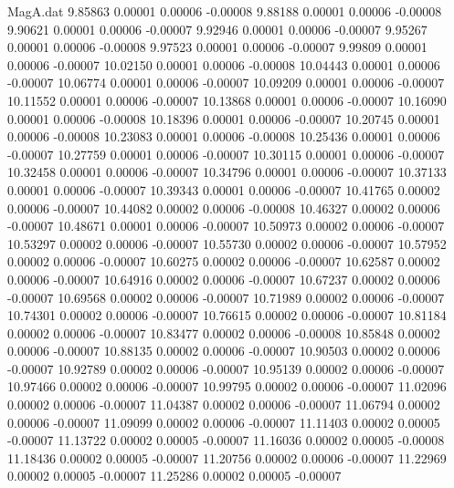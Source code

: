 \begin{filecontents}{MagA.dat}
   9.85863    0.00001    0.00006   -0.00008
   9.88188    0.00001    0.00006   -0.00008
   9.90621    0.00001    0.00006   -0.00007
   9.92946    0.00001    0.00006   -0.00007
   9.95267    0.00001    0.00006   -0.00008
   9.97523    0.00001    0.00006   -0.00007
   9.99809    0.00001    0.00006   -0.00007
  10.02150    0.00001    0.00006   -0.00008
  10.04443    0.00001    0.00006   -0.00007
  10.06774    0.00001    0.00006   -0.00007
  10.09209    0.00001    0.00006   -0.00007
  10.11552    0.00001    0.00006   -0.00007
  10.13868    0.00001    0.00006   -0.00007
  10.16090    0.00001    0.00006   -0.00008
  10.18396    0.00001    0.00006   -0.00007
  10.20745    0.00001    0.00006   -0.00008
  10.23083    0.00001    0.00006   -0.00008
  10.25436    0.00001    0.00006   -0.00007
  10.27759    0.00001    0.00006   -0.00007
  10.30115    0.00001    0.00006   -0.00007
  10.32458    0.00001    0.00006   -0.00007
  10.34796    0.00001    0.00006   -0.00007
  10.37133    0.00001    0.00006   -0.00007
  10.39343    0.00001    0.00006   -0.00007
  10.41765    0.00002    0.00006   -0.00007
  10.44082    0.00002    0.00006   -0.00008
  10.46327    0.00002    0.00006   -0.00007
  10.48671    0.00001    0.00006   -0.00007
  10.50973    0.00002    0.00006   -0.00007
  10.53297    0.00002    0.00006   -0.00007
  10.55730    0.00002    0.00006   -0.00007
  10.57952    0.00002    0.00006   -0.00007
  10.60275    0.00002    0.00006   -0.00007
  10.62587    0.00002    0.00006   -0.00007
  10.64916    0.00002    0.00006   -0.00007
  10.67237    0.00002    0.00006   -0.00007
  10.69568    0.00002    0.00006   -0.00007
  10.71989    0.00002    0.00006   -0.00007
  10.74301    0.00002    0.00006   -0.00007
  10.76615    0.00002    0.00006   -0.00007
  10.81184    0.00002    0.00006   -0.00007
  10.83477    0.00002    0.00006   -0.00008
  10.85848    0.00002    0.00006   -0.00007
  10.88135    0.00002    0.00006   -0.00007
  10.90503    0.00002    0.00006   -0.00007
  10.92789    0.00002    0.00006   -0.00007
  10.95139    0.00002    0.00006   -0.00007
  10.97466    0.00002    0.00006   -0.00007
  10.99795    0.00002    0.00006   -0.00007
  11.02096    0.00002    0.00006   -0.00007
  11.04387    0.00002    0.00006   -0.00007
  11.06794    0.00002    0.00006   -0.00007
  11.09099    0.00002    0.00006   -0.00007
  11.11403    0.00002    0.00005   -0.00007
  11.13722    0.00002    0.00005   -0.00007
  11.16036    0.00002    0.00005   -0.00008
  11.18436    0.00002    0.00005   -0.00007
  11.20756    0.00002    0.00006   -0.00007
  11.22969    0.00002    0.00005   -0.00007
  11.25286    0.00002    0.00005   -0.00007

\end{filecontents}
